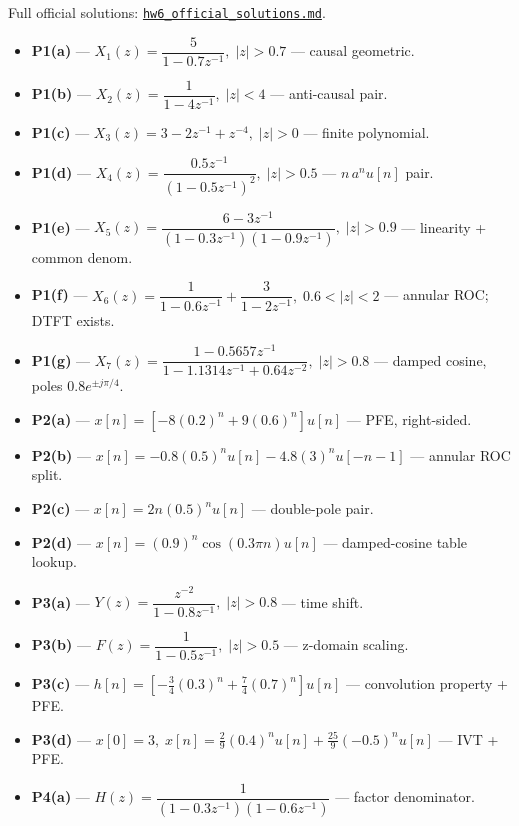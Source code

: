 \documentclass[11pt]{article}
\begin{document}
Full official solutions: \href{../homework/hw6/hw6_official_solutions.md}{\texttt{hw6\_official\_solutions.md}}.

\begin{itemize}[leftmargin=*, nosep]
  \item \textbf{P1(a)} --- $\boxed{X_1(z) = \dfrac{5}{1-0.7z^{-1}},\; |z|>0.7}$ --- causal geometric.
  \item \textbf{P1(b)} --- $\boxed{X_2(z) = \dfrac{1}{1-4z^{-1}},\; |z|<4}$ --- anti-causal pair.
  \item \textbf{P1(c)} --- $\boxed{X_3(z) = 3 - 2z^{-1} + z^{-4},\; |z|>0}$ --- finite polynomial.
  \item \textbf{P1(d)} --- $\boxed{X_4(z) = \dfrac{0.5z^{-1}}{(1-0.5z^{-1})^2},\; |z|>0.5}$ --- $n\,a^n u[n]$ pair.
  \item \textbf{P1(e)} --- $\boxed{X_5(z) = \dfrac{6-3z^{-1}}{(1-0.3z^{-1})(1-0.9z^{-1})},\; |z|>0.9}$ --- linearity + common denom.
  \item \textbf{P1(f)} --- $\boxed{X_6(z) = \dfrac{1}{1-0.6z^{-1}} + \dfrac{3}{1-2z^{-1}},\; 0.6<|z|<2}$ --- annular ROC; DTFT exists.
  \item \textbf{P1(g)} --- $\boxed{X_7(z) = \dfrac{1-0.5657 z^{-1}}{1-1.1314 z^{-1} + 0.64 z^{-2}},\; |z|>0.8}$ --- damped cosine, poles $0.8e^{\pm j\pi/4}$.
  \item \textbf{P2(a)} --- $\boxed{x[n] = [-8(0.2)^n + 9(0.6)^n]u[n]}$ --- PFE, right-sided.
  \item \textbf{P2(b)} --- $\boxed{x[n] = -0.8(0.5)^n u[n] - 4.8(3)^n u[-n-1]}$ --- annular ROC split.
  \item \textbf{P2(c)} --- $\boxed{x[n] = 2n(0.5)^n u[n]}$ --- double-pole pair.
  \item \textbf{P2(d)} --- $\boxed{x[n] = (0.9)^n \cos(0.3\pi n)u[n]}$ --- damped-cosine table lookup.
  \item \textbf{P3(a)} --- $\boxed{Y(z) = \dfrac{z^{-2}}{1-0.8z^{-1}},\; |z|>0.8}$ --- time shift.
  \item \textbf{P3(b)} --- $\boxed{F(z) = \dfrac{1}{1-0.5z^{-1}},\; |z|>0.5}$ --- z-domain scaling.
  \item \textbf{P3(c)} --- $\boxed{h[n] = [-\tfrac{3}{4}(0.3)^n + \tfrac{7}{4}(0.7)^n]u[n]}$ --- convolution property + PFE.
  \item \textbf{P3(d)} --- $\boxed{x[0]=3,\; x[n] = \tfrac{2}{9}(0.4)^n u[n] + \tfrac{25}{9}(-0.5)^n u[n]}$ --- IVT + PFE.
  \item \textbf{P4(a)} --- $\boxed{H(z) = \dfrac{1}{(1-0.3z^{-1})(1-0.6z^{-1})}}$ --- factor denominator.

\end{itemize}
\end{document}
